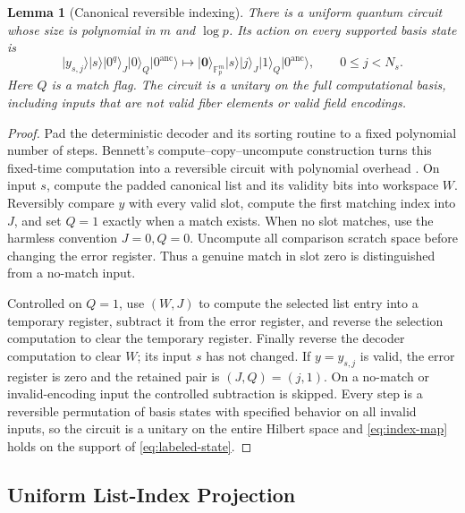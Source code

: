 \documentclass[10pt,a4paper]{amsart}
\newtheorem{lemma}[theorem]{Lemma}
\newcommand{\F}{\mathbb{F}}
\newcommand{\ket}[1]{\lvert #1\rangle}
\begin{document}
\begin{lemma}[Canonical reversible indexing]
\label{lem:index-unitary}
There is a uniform quantum circuit whose size is polynomial in $m$ and $\log p$.  Its action on every supported basis state is
\begin{equation}
   \ket{y_{s,j}}\ket{s}\ket{0^q}_J\ket0_Q\ket{0^{\mathrm{anc}}}
   \longmapsto
   \ket{\mathbf 0}_{\F_p^m}\ket{s}\ket{j}_J\ket1_Q\ket{0^{\mathrm{anc}}},
   \qquad 0\le j<N_s.
   \label{eq:index-map}
\end{equation}
Here $Q$ is a match flag.  The circuit is a unitary on the full computational basis, including inputs that are not valid fiber elements or valid field encodings.
\end{lemma}

\begin{proof}
Pad the deterministic decoder and its sorting routine to a fixed polynomial number of steps.  Bennett's compute--copy--uncompute construction turns this fixed-time computation into a reversible circuit with polynomial overhead \cite{Bennett1973}.  On input $s$, compute the padded canonical list and its validity bits into workspace $W$.  Reversibly compare $y$ with every valid slot, compute the first matching index into $J$, and set $Q=1$ exactly when a match exists.  When no slot matches, use the harmless convention $J=0,Q=0$.  Uncompute all comparison scratch space before changing the error register.  Thus a genuine match in slot zero is distinguished from a no-match input.

Controlled on $Q=1$, use $(W,J)$ to compute the selected list entry into a temporary register, subtract it from the error register, and reverse the selection computation to clear the temporary register.  Finally reverse the decoder computation to clear $W$; its input $s$ has not changed.  If $y=y_{s,j}$ is valid, the error register is zero and the retained pair is $(J,Q)=(j,1)$.  On a no-match or invalid-encoding input the controlled subtraction is skipped.  Every step is a reversible permutation of basis states with specified behavior on all invalid inputs, so the circuit is a unitary on the entire Hilbert space and \cref{eq:index-map} holds on the support of \cref{eq:labeled-state}.
\end{proof}

\subsection{Uniform List-Index Projection}
\end{document}
